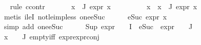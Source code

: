 \begin{isabellebody}
\ \ \isamarkupfalse%
{\isacharparenleft}{\kern0pt}rule\ ccontr{\isacharparenright}{\kern0pt}\isanewline
\ \ \ \ \isamarkupfalse%
\ {\isachardoublequoteopen}{\isasymnot}\ {\isacharparenleft}{\kern0pt}{\isasymforall}x{\isasymin}{\isasymPhi}\ {\isacharbackquote}{\kern0pt}\ J{\isachardot}{\kern0pt}\ expr{\isacharunderscore}{\kern0pt}{}\ x\ {\isasymle}\ {}{\isacharparenright}{\kern0pt}{\isachardoublequoteclose}\isanewline
\ \ \ \ \isamarkupfalse%
\ \isamarkupfalse%
\ x\ \ {\isachardoublequoteopen}x{\isasymin}{\isasymPhi}\ {\isacharbackquote}{\kern0pt}\ J{\isachardoublequoteclose}\ {\isachardoublequoteopen}expr{\isacharunderscore}{\kern0pt}{}\ x\ {\isasymge}\ {}{\isachardoublequoteclose}\ \isanewline
\ \ \ \ \ \ \isamarkupfalse%
\ {\isacharparenleft}{\kern0pt}metis\ ileI{}\ not{\isacharunderscore}{\kern0pt}le{\isacharunderscore}{\kern0pt}imp{\isacharunderscore}{\kern0pt}less\ one{\isacharunderscore}{\kern0pt}eSuc{\isacharparenright}{\kern0pt}\isanewline
\ \ \ \ \isamarkupfalse%
\ {\isachardoublequoteopen}eSuc\ {\isacharparenleft}{\kern0pt}expr{\isacharunderscore}{\kern0pt}{}\ x{\isacharparenright}{\kern0pt}\ {\isasymge}\ {}{\isachardoublequoteclose}\isanewline
\ \ \ \ \ \ \isamarkupfalse%
\ {\isacharparenleft}{\kern0pt}simp\ add{\isacharcolon}{\kern0pt}\ one{\isacharunderscore}{\kern0pt}eSuc{\isacharparenright}{\kern0pt}\isanewline
\ \ \ \ \isamarkupfalse%
\ {\isachardoublequoteopen}{\isacharparenleft}{\kern0pt}Sup\ {\isacharparenleft}{\kern0pt}{\isacharparenleft}{\kern0pt}expr{\isacharunderscore}{\kern0pt}{}\ {\isasymcirc}\ {\isasymPhi}{\isacharparenright}{\kern0pt}\ {\isacharbackquote}{\kern0pt}\ I\ {\isasymunion}\ {\isacharparenleft}{\kern0pt}{\isacharparenleft}{\kern0pt}eSuc\ {\isasymcirc}\ expr{\isacharunderscore}{\kern0pt}{}\ {\isasymcirc}\ {\isasymPhi}{\isacharparenright}{\kern0pt}\ {\isacharbackquote}{\kern0pt}\ J{\isacharparenright}{\kern0pt}{\isacharparenright}{\kern0pt}{\isacharparenright}{\kern0pt}\ {\isasymge}\ {}{\isachardoublequoteclose}\isanewline
\ \ \ \ \ \ \isamarkupfalse%
\ {\isacartoucheopen}x\ {\isasymin}\ {\isasymPhi}\ {\isacharbackquote}{\kern0pt}\ J{\isacartoucheclose}\ empty{\isacharunderscore}{\kern0pt}iff\ expr{\isacharunderscore}{\kern0pt}{}{\isachardot}{\kern0pt}expr{\isacharunderscore}{\kern0pt}{}{\isacharunderscore}{\kern0pt}conj\isanewline

\end{isabellebody}

